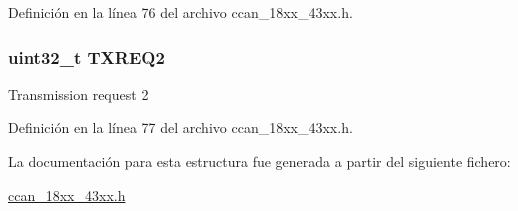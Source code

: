Definición en la línea 76 del archivo ccan\+\_\+18xx\+\_\+43xx.\+h.

\subsubsection[{\texorpdfstring{T\+X\+R\+E\+Q2}{TXREQ2}}]{ uint32\+\_\+t T\+X\+R\+E\+Q2}\hypertarget{struct_l_p_c___c_c_a_n___t_ac6c3024f82207c167ab06e0939060129}{}\label{struct_l_p_c___c_c_a_n___t_ac6c3024f82207c167ab06e0939060129}
Transmission request 2 

Definición en la línea 77 del archivo ccan\+\_\+18xx\+\_\+43xx.\+h.



La documentación para esta estructura fue generada a partir del siguiente fichero\+:\begin{DoxyCompactItemize}
\item 
\hyperlink{ccan__18xx__43xx_8h}{ccan\+\_\+18xx\+\_\+43xx.\+h}\end{DoxyCompactItemize}
